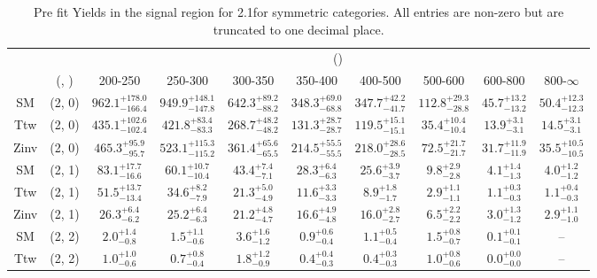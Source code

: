 \begin{table}[h!]
\tiny
\centering
\caption{Pre fit Yields in the signal region for 2.1\ifb for symmetric categories. All entries are non-zero but are truncated to one decimal place.\label{tab:prednodatanaive_sig_comb_sym}}
\begin{tabular}
{cccccccccc}
	\hline\hline
	&	& \multicolumn{8}{c}{\scalht (\gev)}\\ 
	&	 (\njet, \nb) & 200-250 & 250-300 & 300-350 & 350-400 & 400-500 & 500-600 & 600-800 & 800-$\infty$ \\ [0.8ex] 
\hline
	SM & (2, 0) & $962.1^{+ 178.0 }_{- 166.4 }$ & $949.9^{+ 148.1 }_{- 147.8 }$ & $642.3^{+ 89.2 }_{- 88.2 }$ & $348.3^{+ 69.0 }_{- 68.8 }$ & $347.7^{+ 42.2 }_{- 41.7 }$ & $112.8^{+ 29.3 }_{- 28.8 }$ & $45.7^{+ 13.2 }_{- 13.2 }$ & $50.4^{+ 12.3 }_{- 12.3 }$ \\[0.5ex] 
	Ttw & (2, 0) & $435.1^{+ 102.6 }_{- 102.4 }$ & $421.8^{+ 83.4 }_{- 83.3 }$ & $268.7^{+ 48.2 }_{- 48.2 }$ & $131.3^{+ 28.7 }_{- 28.7 }$ & $119.5^{+ 15.1 }_{- 15.1 }$ & $35.4^{+ 10.4 }_{- 10.4 }$ & $13.9^{+ 3.1 }_{- 3.1 }$ & $14.5^{+ 3.1 }_{- 3.1 }$ \\[0.5ex] 
	Zinv & (2, 0) & $465.3^{+ 95.9 }_{- 95.7 }$ & $523.1^{+ 115.3 }_{- 115.2 }$ & $361.4^{+ 65.6 }_{- 65.5 }$ & $214.5^{+ 55.5 }_{- 55.5 }$ & $218.0^{+ 28.6 }_{- 28.5 }$ & $72.5^{+ 21.7 }_{- 21.7 }$ & $31.7^{+ 11.9 }_{- 11.9 }$ & $35.5^{+ 10.5 }_{- 10.5 }$ \\[0.5ex] 
	SM & (2, 1) & $83.1^{+ 17.7 }_{- 16.6 }$ & $60.1^{+ 10.7 }_{- 10.4 }$ & $43.4^{+ 7.4 }_{- 7.1 }$ & $28.3^{+ 6.4 }_{- 6.3 }$ & $25.6^{+ 3.9 }_{- 3.7 }$ & $9.8^{+ 2.9 }_{- 2.8 }$ & $4.1^{+ 1.4 }_{- 1.3 }$ & $4.0^{+ 1.2 }_{- 1.2 }$ \\[0.5ex] 
	Ttw & (2, 1) & $51.5^{+ 13.7 }_{- 13.4 }$ & $34.6^{+ 8.2 }_{- 7.9 }$ & $21.3^{+ 5.0 }_{- 4.9 }$ & $11.6^{+ 3.3 }_{- 3.3 }$ & $8.9^{+ 1.8 }_{- 1.7 }$ & $2.9^{+ 1.1 }_{- 1.1 }$ & $1.1^{+ 0.3 }_{- 0.3 }$ & $1.1^{+ 0.4 }_{- 0.3 }$ \\[0.5ex] 
	Zinv & (2, 1) & $26.3^{+ 6.4 }_{- 6.2 }$ & $25.2^{+ 6.4 }_{- 6.3 }$ & $21.2^{+ 4.8 }_{- 4.7 }$ & $16.6^{+ 4.9 }_{- 4.8 }$ & $16.0^{+ 2.8 }_{- 2.7 }$ & $6.5^{+ 2.2 }_{- 2.2 }$ & $3.0^{+ 1.3 }_{- 1.2 }$ & $2.9^{+ 1.1 }_{- 1.0 }$ \\[0.5ex] 
	SM & (2, 2) & $2.0^{+ 1.4 }_{- 0.8 }$ & $1.5^{+ 1.1 }_{- 0.6 }$ & $3.6^{+ 1.6 }_{- 1.2 }$ & $0.9^{+ 0.6 }_{- 0.4 }$ & $1.1^{+ 0.5 }_{- 0.4 }$ & $1.5^{+ 0.8 }_{- 0.7 }$ & $0.1^{+ 0.1 }_{- 0.1 }$ & -- \\[0.5ex] 
	Ttw & (2, 2) & $1.0^{+ 1.0 }_{- 0.6 }$ & $0.7^{+ 0.8 }_{- 0.4 }$ & $1.8^{+ 1.2 }_{- 0.9 }$ & $0.4^{+ 0.4 }_{- 0.3 }$ & $0.4^{+ 0.3 }_{- 0.3 }$ & $1.0^{+ 0.8 }_{- 0.6 }$ & $0.0^{+ 0.0 }_{- 0.0 }$ & -- \\[0.5ex] 

\end{tabular}
\end{table}

